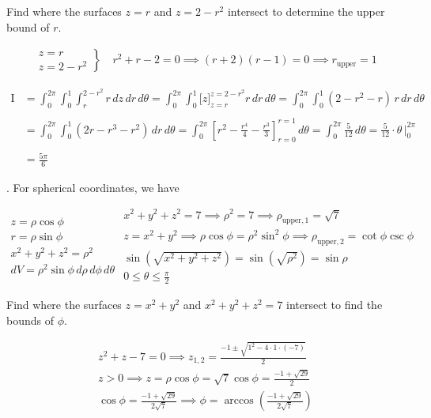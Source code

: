 \documentclass{article}
\begin{document}
\hfill

\noindent Find where the surfaces $z=r$ and $z=2-r^2$ intersect to determine the upper bound of $r$.

\begin{align*}\left.\begin{array}{c}
z=r\\
z=2-r^2
\end{array}\right\}\quad r^2+r-2=0\implies (r+2)(r-1)=0\implies r_{\text{upper}}=1\end{align*}

\newpage

\begin{align*}\mathrm{I}&=\int_0^{2\pi}\int_0^1\int_{r}^{2-r^2}r\,dz\,dr\,d\theta=\int_0^{2\pi}\int_0^1\bigg[z\bigg]_{z=r}^{z=2-r^2}r\,dr\,d\theta=\int_0^{2\pi}\int_0^1\left(2-r^2-r\right)\,r\,dr\,d\theta\\\\&=\int_0^{2\pi}\int_0^1\left(2r-r^3-r^2\right)\,dr\,d\theta=\int_0^{2\pi}\left[r^2-\frac{r^4}4-\frac{r^3}3\right]_{r=0}^{r=1}\,d\theta=\int_0^{2\pi}\frac5{12}\,d\theta=\frac5{12}\cdot\theta\,\bigg|_0^{2\pi}\\\\&=\boxed{\frac{5\pi}6}\end{align*}

\hfill

. For spherical coordinates, we have

\[
\left.\begin{array}{c}
z=\rho\cos\phi\\
r=\rho\sin\phi\\
x^2+y^2+z^2=\rho^2\\
dV=\rho^2\sin\phi\,d\rho\,d\phi\,d\theta
\end{array}\right.\begin{array}{c}
x^2+y^2+z^2=7\implies\rho^2=7\implies\rho_{\text{upper},1}=\sqrt7\\
z=x^2+y^2\implies\rho\cos\phi=\rho^2\sin^2\phi\implies\rho_{\text{upper},2}=\cot\phi\csc\phi\\[1em]
\sin\left(\sqrt{x^2+y^2+z^2}\right)=\sin\left(\sqrt{\rho^2}\right)=\sin\rho\\[1em]
\displaystyle0\leq\theta\leq\frac\pi2
\end{array}\]

\hfill

\noindent Find where the surfaces $z=x^2+y^2$ and $x^2+y^2+z^2=7$ intersect to find the bounds of $\phi$.

\[\begin{array}{c}\displaystyle z^2+z-7=0\implies z_{1,2}=\frac{-1\pm\sqrt{1^2-4\cdot1\cdot(-7)}}2\\[1em]\displaystyle z>0\implies z=\rho\cos\phi=\sqrt7\cos\phi=\frac{-1+\sqrt{29}}{2}\\[1em]\displaystyle\cos\phi=\frac{-1+\sqrt{29}}{2\sqrt7}\implies\phi=\arccos\left(\frac{-1+\sqrt{29}}{2\sqrt7}\right)\end{array}\]
\end{document}
